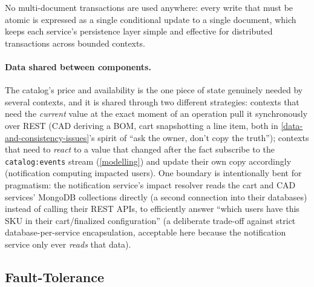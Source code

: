 No multi-document transactions are used anywhere: every write that must be
atomic is expressed as a single conditional update to a single document, which
keeps each service's persistence layer simple and effective for
distributed transactions across bounded contexts.

\paragraph{Data shared between components.} The catalog's price and
availability is the one piece of state genuinely needed by several contexts,
and it is shared through two different strategies: contexts that need the
\emph{current} value at the exact moment
of an operation pull it synchronously over REST (CAD deriving a BOM, cart
snapshotting a line item, both in \cref{data-and-consistency-issues}'s spirit
of ``ask the owner, don't copy the truth''); contexts that need to
\emph{react} to a value that changed after the fact subscribe to the
\texttt{catalog:events} stream (\cref{modelling}) and update their own copy
accordingly (notification computing impacted
users). One boundary is intentionally bent for pragmatism: the notification
service's impact resolver reads the cart and CAD services' MongoDB
collections directly (a second connection into their databases) instead of
calling their REST APIs, to efficiently answer ``which users have this SKU in
their cart/finalized configuration'' (a deliberate
trade-off against strict database-per-service encapsulation, acceptable here
because the notification service only ever \emph{reads} that data).

\subsection{Fault-Tolerance}\label{fault-tolerance}

